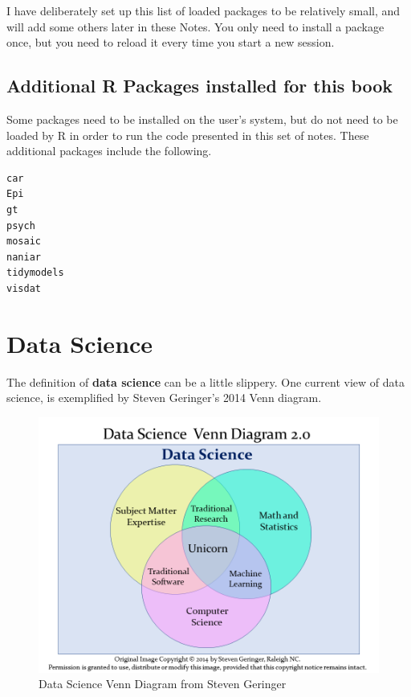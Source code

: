 \documentclass[
]{book}
\begin{document}
I have deliberately set up this list of loaded packages to be relatively small, and will add some others later in these Notes. You only need to install a package once, but you need to reload it every time you start a new session.

\hypertarget{additional-r-packages-installed-for-this-book}{%
\section{Additional R Packages installed for this book}\label{additional-r-packages-installed-for-this-book}}

Some packages need to be installed on the user's system, but do not need to be loaded by R in order to run the code presented in this set of notes. These additional packages include the following.

\begin{verbatim}
car
Epi
gt
psych
mosaic
naniar
tidymodels
visdat
\end{verbatim}

\hypertarget{data-science}{%
\chapter{Data Science}\label{data-science}}

The definition of \textbf{data science} can be a little slippery. One current view of data science, is exemplified by Steven Geringer's 2014 Venn diagram.

\begin{figure}
\includegraphics[width=0.8\linewidth]{figures/data-science-venn20} \caption{Data Science Venn Diagram from Steven Geringer}\label{fig:datasci-fig}
\end{figure}
\end{document}

